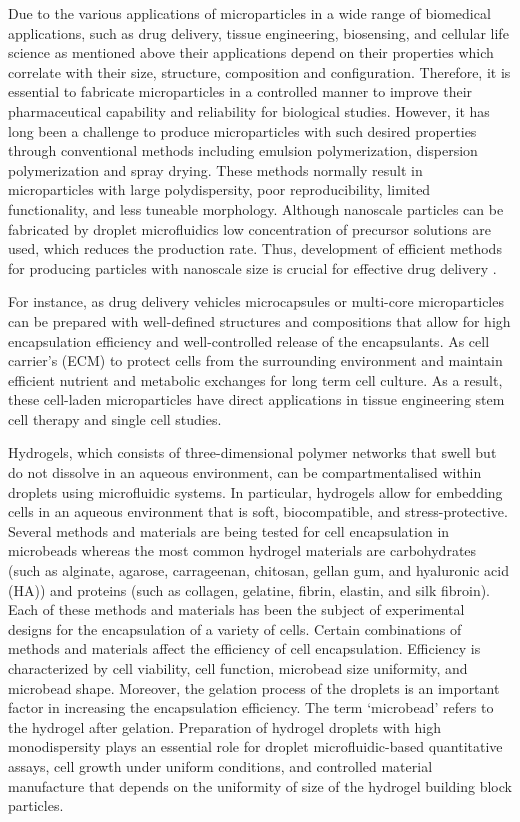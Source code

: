 Due to the various applications of microparticles in a wide range of biomedical applications, such as drug delivery, tissue engineering, biosensing, and cellular life science as mentioned above their applications depend on their properties which correlate with their size, structure, composition and configuration. Therefore, it is essential to fabricate microparticles in a controlled manner to improve their pharmaceutical capability and reliability for biological studies. However, it has long been a challenge to produce microparticles with such desired properties through conventional methods including emulsion polymerization, dispersion polymerization and spray drying. These methods normally result in microparticles with large polydispersity, poor reproducibility, limited functionality, and less tuneable morphology. Although nanoscale particles can be fabricated by droplet microfluidics low concentration of precursor solutions are used, which reduces the production rate. Thus, development of efficient methods for producing particles with nanoscale size is crucial for effective drug delivery \parencite{Liu2014,Patarroyo2020}.

For instance, as drug delivery vehicles microcapsules or multi-core microparticles can be prepared with well-defined structures and compositions that allow for high encapsulation efficiency and well-controlled release of the encapsulants. As cell carrier’s 
(ECM) to protect cells from the surrounding environment and maintain efficient nutrient and metabolic exchanges for long term cell culture. As a result, these cell-laden microparticles have direct applications in tissue engineering stem cell therapy and single cell studies.\parencite{Saldin2017,PrezLuna2018}
\blankline


Hydrogels, which consists of three-dimensional polymer networks that swell but do not dissolve in an aqueous environment, can be compartmentalised within droplets using microfluidic systems. In particular, hydrogels allow for embedding cells in an aqueous environment that is soft, biocompatible, and stress-protective. Several methods and materials are being tested for cell encapsulation in microbeads whereas the most common hydrogel materials are carbohydrates (such as alginate, agarose, carrageenan, chitosan, gellan gum, and hyaluronic acid (HA)) and proteins (such as collagen, gelatine, fibrin, elastin, and silk fibroin). Each of these methods and materials has been the subject of experimental designs for the encapsulation of a variety of cells. Certain combinations of methods and materials affect the efficiency of cell encapsulation. Efficiency is characterized by cell viability, cell function, microbead size uniformity, and microbead shape. Moreover, the gelation process of the droplets is an important factor in increasing the encapsulation efficiency. The term ‘microbead’ refers to the hydrogel after gelation. Preparation of hydrogel droplets with high monodispersity plays an essential role for droplet microfluidic-based quantitative assays, cell growth under uniform conditions, and controlled material manufacture that depends on the uniformity of size of the hydrogel building block particles. \parencite{2020,Rashid2019,Nicodemus2008,Vasile2020,Shintaku2006}